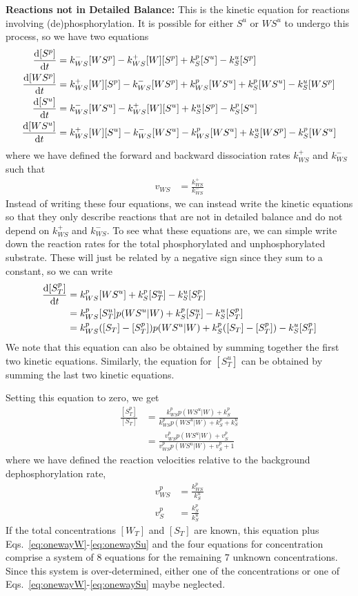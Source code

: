 \documentclass[aps,onecolumn,superscriptaddress,notitlepage]{revtex4-1}
\begin{document}
\textbf{Reactions not in  Detailed Balance:}
This is the kinetic equation for reactions involving (de)phosphorylation. 
It is possible for either $S^u$ or $WS^u$ to undergo this process, so we have two equations
\begin{align}
\dv{[S^p]}{t} &=  k_{WS}^-[WS^p] - k_{WS}^+[W][S^p] + k_S^p[S^u] - k_S^u[S^p]\\
\dv{[WS^p]}{t} &= k_{WS}^+[W][S^p] -k_{WS}^-[WS^p] + k_{WS}^p[WS^u] + k_S^p[WS^u] - k_S^u[WS^p]\\
\dv{[S^u]}{t} &=  k_{WS}^-[WS^u] - k_{WS}^+[W][S^u] + k_S^u[S^p] - k_S^p[S^u]\\
\dv{[WS^u]}{t} &= k_{WS}^+[W][S^u] -k_{WS}^-[WS^u] - k_{WS}^p[WS^u] + k_S^u[WS^p] - k_S^p[WS^u]
\end{align}
where we have defined the forward and backward dissociation rates $k_{WS}^+$ and $k_{WS}^-$ such that
\begin{align}
v_{WS} &= \frac{k_{WS}^+}{k_{WS}^-}
\end{align}
Instead of writing these four equations, we can instead write the kinetic equations so that they only describe reactions that are not in detailed balance and do not depend on $k_{WS}^+$ and $k_{WS}^-$. To see what these equations are, we can simple write down the reaction rates for the total phosphorylated and unphosphorylated substrate.
These will just be related by a negative sign since they sum to a constant, so we can write
\begin{align}
\dv{[S^p_T]}{t} &= k_{WS}^p[WS^u] + k_S^p[S_T^u] - k_S^u[S_T^p]\\
&= k_{WS}^p[S_T^u]p(WS^u|W) + k_S^p[S_T^u] - k_S^u[S_T^p]\\
&= k_{WS}^p([S_T]-[S_T^p])p(WS^u|W) + k_S^p([S_T]-[S_T^p]) - k_S^u[S_T^p]
\end{align}
We note that this equation can also be obtained by summing together the first two kinetic equations. Similarly, the equation for $[S^u_T]$ can be obtained by summing the last two kinetic equations.


Setting this equation to zero, we get
\begin{align}
\frac{[S_T^p]}{[S_T]} &= \frac{k_{WS}^p p(WS^u|W) + k_S^p}{k_{WS}^p p(WS^u|W) + k_S^p+k_S^u}\\
& = \frac{v_{WS}^p p(WS^u|W) + v_S^p}{v_{WS}^p p(WS^u|W) + v_S^p+1}
\end{align}
where we have defined the reaction velocities relative to the background dephosphorylation rate,
\begin{align}
v_{WS}^p &= \frac{k_{WS}^p}{k_S^u}\\
v_S^p &= \frac{k_S^p}{k_S^u}
\end{align}
If the total concentrations $[W_T]$ and $[S_T]$ are known, this equation plus Eqs.~\eqref{eq:onewayW}-\eqref{eq:onewaySu} and the four equations for concentration comprise a system of 8 equations for the remaining 7 unknown concentrations. Since this system is over-determined, either one of the concentrations or one of Eqs.~\eqref{eq:onewayW}-\eqref{eq:onewaySu} maybe neglected.
\end{document}

